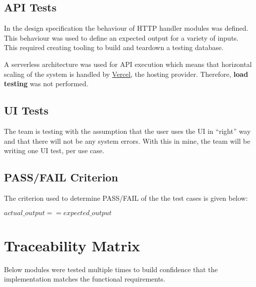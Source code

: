 \documentclass[fullpage]{article}
\begin{document}
\subsection{API Tests}
In the design specification the behaviour of HTTP handler modules was defined. This behaviour was used to define an expected output for a variety of inputs. This required creating tooling to build and teardown a testing database.

A serverless architecture was used for API execution which means that horizontal scaling of the system is handled by \href{https://vercel.com}{Vercel}, the hosting provider. Therefore, \textbf{load testing} was not performed.


\subsection{UI Tests}
The team is testing with the assumption that the user uses the UI in ``right'' way and that there will not be any system errors. With this in mine, the team will be writing one UI test, per use case.


\subsection{PASS/FAIL Criterion}
The criterion used to determine PASS/FAIL of the the test cases is given below:
\begin{center}
    {$actual\_output == expected\_output$}
\end{center}

\newpage

\section{Traceability Matrix}
Below modules were tested multiple times to build confidence that the implementation matches the functional requirements.
\end{document}
